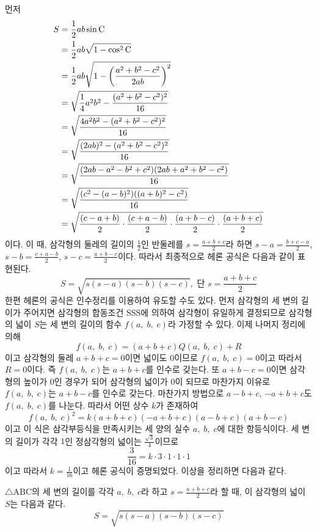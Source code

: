 \documentclass[11pt, a4paper]{book}
\begin{document}
  먼저
 \begin{align*}
 	S &=\frac{1}{2}a b \sin \textrm{C} \\
 	 & = \frac{1}{2}ab \sqrt{1- \cos^{2}\textrm{C}}\\
 	 & = \frac{1}{2} ab \sqrt{1 - \left(\frac{a^2 +b^2 - c^2}{2ab}\right)^2}\\
 	 &= \sqrt{\frac{1}{4}a^2b^2 - \frac{(a^2+b^2-c^2)^2}{16}} \\
 	 &=\sqrt{\frac{4a^2b^2 -(a^2+b^2-c^2)^2}{16}} \\
 	 &=\sqrt{\frac{(2ab)^2 -(a^2+b^2-c^2)^2}{16}} \\
 	 &=\sqrt{\frac{(2ab - a^2 -b^2 +c^2)(2ab + a^2+b^2 -c^2)}{16}} \\
 	 & = \sqrt{\frac{(c^2 - (a-b)^2)((a+b)^2 -c^2)}{16}} \\
 	 &= \sqrt{\frac{(c-a+b)}{2}\cdot \frac{(c+a-b)}{2}\cdot \frac{(a+b-c)}{2} \cdot \frac{(a+b+c)}{2}}
 \end{align*}
이다. 이 때, 삼각형의 둘레의 길이의 $\frac{1}{2}$인 반둘레를 $s=\frac{a+b+c}{2}$라 하면
$s-a =\frac{b+c-a}{2}$, $s-b =\frac{c+a-b}{2}$, $s-c =\frac{a+b-c}{2}$이다. 따라서 최종적으로 헤론 공식은 다음과 같이 표현된다.
\[
S = \sqrt{s(s-a)(s-b)(s-c)}, \text{ 단 } s =\frac{a+b+c}{2}
\]
한편 헤론의 공식은 인수정리를 이용하여 유도할 수도 있다. 먼저 삼각형의 세 변의 길이가 주어지면 삼각형의 합동조건 SSS에 의하여 삼각형이 유일하게 결정되므로 삼각형의 넓이 $S$는 세 변의 길이의 함수 $f(a, \;b,\;c)$라 가정할 수 있다. 이제 나머지 정리에 의해
\[
	f(a,\;b, \;c) =(a+b+c) Q(a,\;b,\;c) + R
\]
이고 삼각형의 둘레 $a+b+c=0$이면 넓이도 $0$이므로 $f(a,\;b, \;c)=0$이고 따라서 $R=0$이다. 즉 $f(a,\;b, \;c)$는 $a+b+c$를 인수로 갖는다.  또 $a+b-c=0$이면 삼각형의 높이가 $0$인 경우가 되어 삼각형의 넓이가 $0$이 되므로 마찬가지 이유로 $f(a,\;b, \;c)$는 $a+b-c$를 인수로 갖는다.  마찬가지 방법으로 $a-b+c$, $-a+b+c$도 $f(a,\;b, \;c)$를 나눈다. 따라서 어떤 상수 $k$가 존재하여
\[
f(a,\;b, \;c)^2 = k (a+b+c)(-a+b+c)(a-b+c)(a+b-c)
\]
이고 이 식은 삼각부등식을 만족시키는 세 양의 실수 $a,\;b,\;c$에 대한 항등식이다. 세 변의 길이가 각각 $1$인 정삼각형의 넓이는 $\frac{\sqrt{3}}{4}$이므로 
\[
\frac{3}{16} =k\cdot 3 \cdot 1 \cdot 1 \cdot 1
\]
이고 따라서 $k =\frac{1}{16}$이고 헤론 공식이 증명되었다.
이상을 정리하면 다음과 같다.
\begin{theorem}[헤론 공식]
	$\triangle \textrm{ABC}$의 세 변의 길이를 각각 $a,\;b,\;c$라 하고 $s =\frac{a+b+c}{2}$라 할 때, 이 삼각형의 넓이 $S$는 다음과 같다.
	\[
	S =\sqrt{s(s-a)(s-b)(s-c)}
	\]
\end{theorem}
\end{document}
